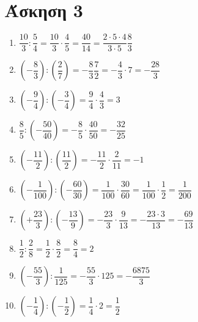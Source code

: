 \documentclass[a4paper,10pt]{report}
\begin{document}
\section*{Άσκηση 3  \hfill \small{}}
\begin{enumerate}[1)]
 \item $\dfrac{10}{3}:\dfrac{5}{4}=\dfrac{10}{3}\cdot \dfrac{4}{5}=\dfrac{40}{14}=\dfrac{2\cdot 5 \cdot 4}{3\cdot5}\dfrac{8}{3}$
 \item $(-\dfrac{8}{3}):(\dfrac{2}{7})=-\dfrac{8}{3}\dfrac{7}{2}=-\dfrac{4}{3}\cdot 7=-\dfrac{28}{3}$
 \item $(-\dfrac{9}{4}):(-\dfrac{3}{4})=\dfrac{9}{4}\cdot \dfrac{4}{3}=3$
 \item $\dfrac{8}{5}:(-\dfrac{50}{40})=-\dfrac{8}{5}\cdot \dfrac{40}{50}=-\dfrac{32}{25}$
 \item $(-\dfrac{11}{2}):(\dfrac{11}{2})=-\dfrac{11}{2}\cdot \dfrac{2}{11}=-1$
 \item $(-\dfrac{1}{100}):(-\dfrac{60}{30})=\dfrac{1}{100}\cdot \dfrac{30}{60}=\dfrac{1}{100}\cdot \dfrac{1}{2}=\dfrac{1}{200}$
 \item $(+\dfrac{23}{3}):(-\dfrac{13}{9})=-\dfrac{23}{3}\cdot \dfrac{9}{13}=-\dfrac{23\cdot 3}{13}=-\dfrac{69}{13}$
 \item $\dfrac{1}{2}:\dfrac{2}{8}=\dfrac{1}{2}\cdot \dfrac{8}{2}=\dfrac{8}{4}=2$
 \item $(-\dfrac{55}{3}):\dfrac{1}{125}=-\dfrac{55}{3}\cdot 125=-\dfrac{6875}{3}$
 \item $(-\dfrac{1}{4}):(-\dfrac{1}{2})=\dfrac{1}{4}\cdot 2=\dfrac{1}{2}$
\end{enumerate}
\end{document}
